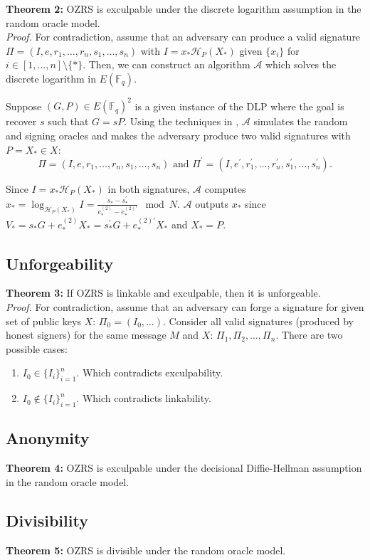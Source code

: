 \documentclass{article}
\newcommand{\sidx}{\ensuremath{*}}
\newcommand{\ix}{\ensuremath{x_i}}
\newcommand{\sx}{\ensuremath{x_\sidx}}
\newcommand{\spk}{\ensuremath{X_\sidx}}
\newcommand{\alg}{\ensuremath{\mathcal{A}}}
\newcommand{\hp}{\ensuremath{\mathcal{H}_P}}
\newcommand{\curve}{\ensuremath{E(\mathbb{F}_q)}}
\begin{document}
{\bf Theorem 2:} OZRS is exculpable under the discrete logarithm assumption in
the random oracle model. \\

{\it Proof.} For contradiction, assume that an adversary can produce a valid
signature $\Pi=(I, e, r_1, \dots, r_n, s_1, \dots, s_n)$ with $I = \sx
\hp(\spk)$ given $\{\ix\}$ for $i \in [1,\dots,n] \setminus \{*\}$.  Then, we
can construct an algorithm {\alg} which solves the discrete logarithm in
{\curve}.

Suppose $(G, P) \in \curve^2$ is a given instance of the DLP where the goal is
recover $s$ such that $G = sP$.  Using the techniques in \cite{HOLYGRAIL},
{\alg} simulates the random and signing oracles and makes the adversary produce
two valid signatures with $P = \spk \in X$: 
\[
\Pi = (I,e,r_1,\dots,r_n,s_1,\dots,s_n) 
\text{~and~} 
\Pi^\prime = (I,e^\prime,r_1^\prime,\dots,r_n^\prime,s_1^\prime,\dots,s_n^\prime).
\]

Since $I = \sx \hp(\spk)$ in both signatures, {\alg} computes $\sx =
\log_{\hp(\spk)} I = \frac{s_* - s_*^\prime}{e_*^{(2)} - e_*^{(2)\prime}} \mod
N$. {\alg} outputs $\sx$ since $V_* = s_* G + e_*^{(2)} \spk = s_*^\prime G +
e_*^{(2)\prime} \spk$ and $\spk = P$.

\subsection{Unforgeability}

{\bf Theorem 3:} If OZRS is linkable and exculpable, then it is unforgeable. \\

{\it Proof.}  For contradiction, assume that an adversary can forge a signature
for given set of public keys $X$: $\Pi_0 = (I_0,\dots)$.  Consider all valid
signatures (produced by honest signers) for the same message $M$ and $X$:
$\Pi_1, \Pi_2, \dots, \Pi_n$.  There are two possible cases:
\begin{enumerate}
  \item $I_0 \in \{I_i\}_{i=1}^n$.  Which contradicts exculpability.
  \item $I_0 \notin \{I_i\}_{i=1}^n$.  Which contradicts linkability.
\end{enumerate}

\subsection{Anonymity}

{\bf Theorem 4:} OZRS is exculpable under the decisional Diffie-Hellman
assumption in the random oracle model.

\subsection{Divisibility}

{\bf Theorem 5:} OZRS is divisible under the random oracle model.


\end{document}
